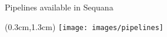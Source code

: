 
\begin{frame}{Pipelines available in Sequana}
    \begin{textblock*}{5cm}(0.3cm,1.3cm)
        \texttt{[image: images/pipelines]}
    \end{textblock*}
\end{frame}


